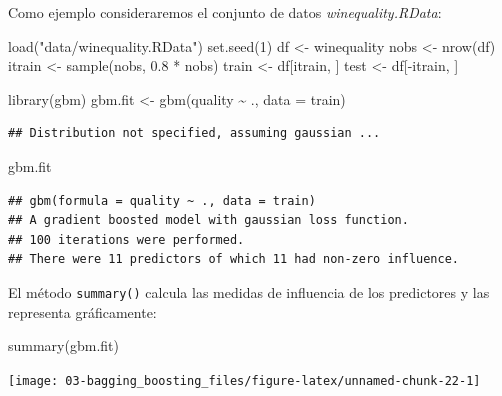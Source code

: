 \documentclass[
]{book}
\newenvironment{Shaded}{\begin{snugshade}}{\end{snugshade}}
\newcommand{\AttributeTok}[1]{\textcolor[rgb]{0.77,0.63,0.00}{#1}}
\newcommand{\DecValTok}[1]{\textcolor[rgb]{0.00,0.00,0.81}{#1}}
\newcommand{\FloatTok}[1]{\textcolor[rgb]{0.00,0.00,0.81}{#1}}
\newcommand{\FunctionTok}[1]{\textcolor[rgb]{0.00,0.00,0.00}{#1}}
\newcommand{\NormalTok}[1]{#1}
\newcommand{\OtherTok}[1]{\textcolor[rgb]{0.56,0.35,0.01}{#1}}
\newcommand{\SpecialCharTok}[1]{\textcolor[rgb]{0.00,0.00,0.00}{#1}}
\newcommand{\StringTok}[1]{\textcolor[rgb]{0.31,0.60,0.02}{#1}}
\theoremstyle{break}
\theoremstyle{definition}
\theoremstyle{definition}
\theoremstyle{definition}
\theoremstyle{definition}
\theoremstyle{remark}
\begin{document}
Como ejemplo consideraremos el conjunto de datos \emph{winequality.RData}:

\begin{Shaded}
\begin{Highlighting}[]
\FunctionTok{load}\NormalTok{(}\StringTok{"data/winequality.RData"}\NormalTok{)}
\FunctionTok{set.seed}\NormalTok{(}\DecValTok{1}\NormalTok{)}
\NormalTok{df }\OtherTok{\textless{}{-}}\NormalTok{ winequality}
\NormalTok{nobs }\OtherTok{\textless{}{-}} \FunctionTok{nrow}\NormalTok{(df)}
\NormalTok{itrain }\OtherTok{\textless{}{-}} \FunctionTok{sample}\NormalTok{(nobs, }\FloatTok{0.8} \SpecialCharTok{*}\NormalTok{ nobs)}
\NormalTok{train }\OtherTok{\textless{}{-}}\NormalTok{ df[itrain, ]}
\NormalTok{test }\OtherTok{\textless{}{-}}\NormalTok{ df[}\SpecialCharTok{{-}}\NormalTok{itrain, ]}

\FunctionTok{library}\NormalTok{(gbm)}
\NormalTok{gbm.fit }\OtherTok{\textless{}{-}} \FunctionTok{gbm}\NormalTok{(quality }\SpecialCharTok{\textasciitilde{}}\NormalTok{ ., }\AttributeTok{data =}\NormalTok{ train)}
\end{Highlighting}
\end{Shaded}

\begin{verbatim}
## Distribution not specified, assuming gaussian ...
\end{verbatim}

\begin{Shaded}
\begin{Highlighting}[]
\NormalTok{gbm.fit}
\end{Highlighting}
\end{Shaded}

\begin{verbatim}
## gbm(formula = quality ~ ., data = train)
## A gradient boosted model with gaussian loss function.
## 100 iterations were performed.
## There were 11 predictors of which 11 had non-zero influence.
\end{verbatim}

El método \texttt{summary()} calcula las medidas de influencia de los predictores y las representa gráficamente:

\begin{Shaded}
\begin{Highlighting}[]
\FunctionTok{summary}\NormalTok{(gbm.fit)}
\end{Highlighting}
\end{Shaded}

\begin{center}\texttt{[image: 03-bagging\_boosting\_files/figure-latex/unnamed-chunk-22-1]} \end{center}
\end{document}
